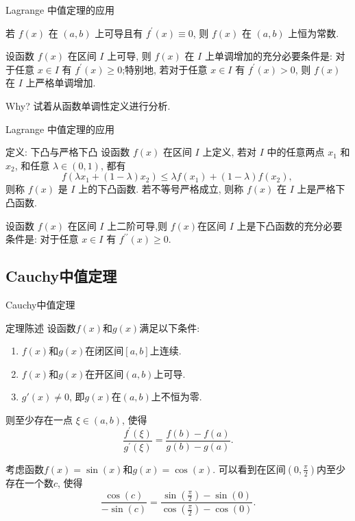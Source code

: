 \documentclass[
10pt,
aspectratio=43,
]{beamer}
\begin{document}
\begin{frame}{Lagrange 中值定理的应用}
	\begin{theorem}[常数函数的判定]
		若 $f(x)$ 在 $(a, b)$ 上可导且有 $f^{\prime}(x) \equiv 0$, 则 $f(x)$ 在 $(a, b)$ 上恒为常数.
	\end{theorem}
	\begin{theorem}[一阶导数与单调性的关系]
		设函数 $f(x)$ 在区间 $I$ 上可导, 则 $f(x)$ 在 $I$ 上单调增加的充分必要条件是: 对于任意 $x \in I$ 有 $f^{\prime}(x) \geqslant 0$;特别地, 若对于任意 $x \in I$ 有 $f^{\prime}(x)>0$, 则 $f(x)$ 在 $I$ 上严格单调增加.
	\end{theorem}
	Why? 试着从函数单调性定义进行分析.
\end{frame}

\begin{frame}{Lagrange 中值定理的应用}
	\begin{block}{定义: 下凸与严格下凸}
		设函数 $f(x)$ 在区间 $I$ 上定义, 若对 $I$ 中的任意两点 $x_1$ 和 $x_2$, 和任意 $\lambda \in(0,1)$, 都有
		$$
			f\left(\lambda x_1+(1-\lambda) x_2\right) \leqslant \lambda f\left(x_1\right)+(1-\lambda) f\left(x_2\right) \text {, }
		$$
		则称 $f(x)$ 是 $I$ 上的下凸函数.
		若不等号严格成立, 则称 $f(x)$ 在 $I$ 上是严格下凸函数.
	\end{block}
	\begin{theorem}[二阶导数与凸性的关系]
		设函数 $f(x)$ 在区间 $I$ 上二阶可导,则 $f(x)$在区间 $I$ 上是下凸函数的充分必要条件是: 对于任意 $x \in I$ 有 $f^{\prime \prime}(x) \geqslant 0$.
	\end{theorem}
\end{frame}

\subsection{Cauchy中值定理}
\begin{frame}{Cauchy中值定理}
	\begin{block}{定理陈述}
		设函数$f(x)$和$g(x)$满足以下条件:
		\begin{enumerate}
			\item $f(x)$和$g(x)$在闭区间$[a, b]$上连续.
			\item $f(x)$和$g(x)$在开区间$(a, b)$上可导.
			\item $g'(x) \neq 0$, 即$g(x)$在$(a, b)$上不恒为零.
		\end{enumerate}
		则至少存在一点 $\xi \in(a, b)$, 使得
		$$
			\frac{f^{\prime}(\xi)}{g^{\prime}(\xi)}=\frac{f(b)-f(a)}{g(b)-g(a)} .
		$$
	\end{block}

	\pause

	\begin{example}
		考虑函数$f(x) = \sin(x)$和$g(x) = \cos(x)$. 可以看到在区间$(0, \frac{\pi}{2})$内至少存在一个数$c$, 使得
		$$
			\frac{\cos(c)}{-\sin(c)}=\frac{\sin(\frac{\pi}{2}) - \sin(0)}{\cos(\frac{\pi}{2}) - \cos(0)}.
		$$
	\end{example}
\end{frame}
\end{document}

